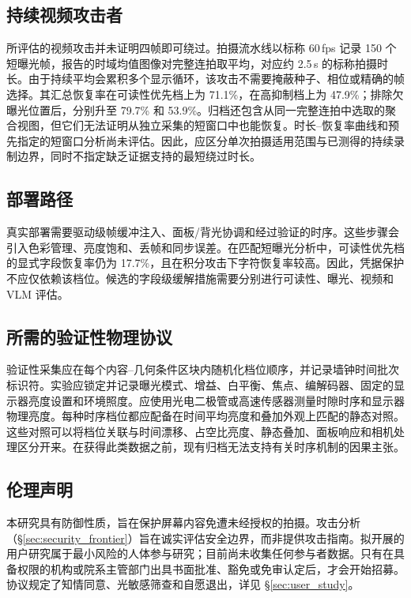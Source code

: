 \documentclass{ieeeaccess}
\begin{document}
\subsection{持续视频攻击者}

所评估的视频攻击并未证明四帧即可绕过。拍摄流水线以标称 60\,fps 记录 150 个短曝光帧，报告的时域均值图像对完整连拍取平均，对应约 2.5\,s 的标称拍摄时长。由于持续平均会累积多个显示循环，该攻击不需要掩蔽种子、相位或精确的帧选择。其汇总恢复率在可读性优先档上为 71.1\%，在高抑制档上为 47.9\%；排除欠曝光位置后，分别升至 79.7\% 和 53.9\%。归档还包含从同一完整连拍中选取的聚合视图，但它们无法证明从独立采集的短窗口中也能恢复。时长--恢复率曲线和预先指定的短窗口分析尚未评估。因此，应区分单次拍摄适用范围与已测得的持续录制边界，同时不指定缺乏证据支持的最短绕过时长。

\subsection{部署路径}

真实部署需要驱动级帧缓冲注入、面板/背光协调和经过验证的时序。这些步骤会引入色彩管理、亮度饱和、丢帧和同步误差。在匹配短曝光分析中，可读性优先档的显式字段恢复率仍为 17.7\%，且在积分攻击下字符恢复率较高。因此，凭据保护不应仅依赖该档位。候选的字段级缓解措施需要分别进行可读性、曝光、视频和 VLM 评估。

\subsection{所需的验证性物理协议}

验证性采集应在每个内容--几何条件区块内随机化档位顺序，并记录墙钟时间批次标识符。实验应锁定并记录曝光模式、增益、白平衡、焦点、编解码器、固定的显示器亮度设置和环境照度。应使用光电二极管或高速传感器测量时隙时序和显示器物理亮度。每种时序档位都应配备在时间平均亮度和叠加外观上匹配的静态对照。这些对照可以将档位关联与时间漂移、占空比亮度、静态叠加、面板响应和相机处理区分开来。在获得此类数据之前，现有归档无法支持有关时序机制的因果主张。

\subsection{伦理声明}

本研究具有防御性质，旨在保护屏幕内容免遭未经授权的拍摄。攻击分析（\S\ref{sec:security_frontier}）旨在诚实评估安全边界，而非提供攻击指南。拟开展的用户研究属于最小风险的人体参与研究；目前尚未收集任何参与者数据。只有在具备权限的机构或院系主管部门出具书面批准、豁免或免审认定后，才会开始招募。协议规定了知情同意、光敏感筛查和自愿退出，详见 \S\ref{sec:user_study}。
\end{document}
